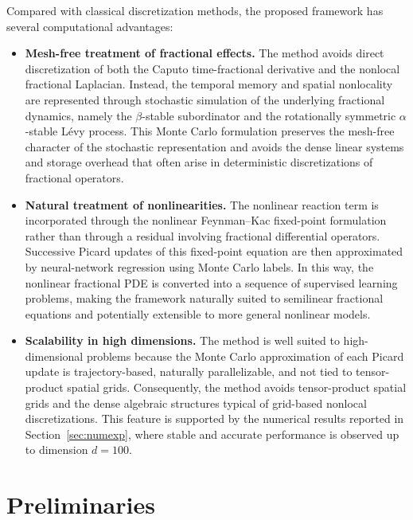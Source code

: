 \documentclass[a4paper,fleqn]{cas-sc}
\begin{document}
Compared with classical discretization methods, the proposed framework has several computational advantages:
\begin{itemize}
    \item \textbf{Mesh-free treatment of fractional effects.}
    The method avoids direct discretization of both the Caputo time-fractional
    derivative and the nonlocal fractional Laplacian. Instead, the temporal
    memory and spatial nonlocality are represented through stochastic simulation
    of the underlying fractional dynamics, namely the $\beta$-stable
    subordinator and the rotationally symmetric $\alpha$-stable L\'evy process.
    This Monte Carlo formulation preserves the mesh-free character of the
    stochastic representation and avoids the dense linear systems and storage
    overhead that often arise in deterministic discretizations of fractional
    operators.
    
    \item \textbf{Natural treatment of nonlinearities.}
    The nonlinear reaction term is incorporated through the nonlinear
    Feynman--Kac fixed-point formulation rather than through a residual
    involving fractional differential operators. Successive Picard updates of
    this fixed-point equation are then approximated by neural-network
    regression using Monte Carlo labels. In this way, the nonlinear fractional
    PDE is converted into a sequence of supervised learning problems, making
    the framework naturally suited to semilinear fractional equations and
    potentially extensible to more general nonlinear models.
    
    
    \item \textbf{Scalability in high dimensions.}
    The method is well suited to high-dimensional problems because the Monte Carlo approximation of each Picard update is trajectory-based, naturally parallelizable, and not tied to tensor-product spatial grids. Consequently, the method avoids tensor-product spatial grids and the dense
algebraic structures typical of grid-based nonlocal discretizations. This feature is supported by the numerical results reported in Section~\ref{sec:numexp}, where stable and accurate performance is observed up to dimension $d=100$.
\end{itemize}

\section{Preliminaries}\label{sec:prelim}
\end{document}
